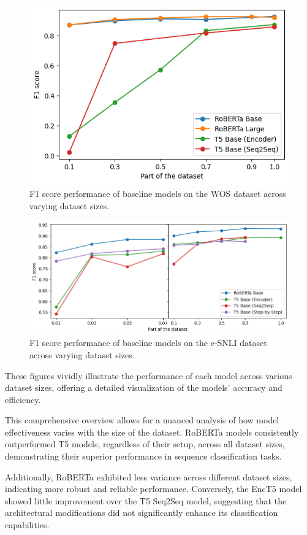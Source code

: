 \begin{figure}[p]
    \centering
    \includegraphics[width=0.63\linewidth]{figs/wos_baseline.png}
    \caption{F1 score performance of baseline models on the WOS dataset across varying dataset sizes.}
    \label{fig:baselines:wos}
\end{figure}
\begin{figure}[p]
    \centering
    \includegraphics[width=\linewidth]{figs/esnli_baseline.png}
    \caption{F1 score performance of baseline models on the e-SNLI dataset across varying dataset sizes.}
    \label{fig:baselines:esnli}
\end{figure}

These figures vividly illustrate the performance of each model across various dataset sizes, offering a detailed visualization of the models' accuracy and efficiency.

This comprehensive overview allows for a nuanced analysis of how model effectiveness varies with the size of the dataset. RoBERTa models consistently outperformed T5 models, regardless of their setup, across all dataset sizes, demonstrating their superior performance in sequence classification tasks.

Additionally, RoBERTa exhibited less variance across different dataset sizes, indicating more robust and reliable performance. Conversely, the EncT5 model showed little improvement over the T5 Seq2Seq model, suggesting that the architectural modifications did not significantly enhance its classification capabilities.

